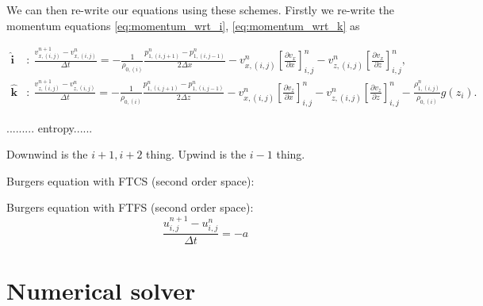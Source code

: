\documentclass{article}
\begin{document}
We can then re-write our equations using these schemes. Firstly we re-write the momentum equations \ref{eq:momentum_wrt_i}, \ref{eq:momentum_wrt_k} as

\begin{align}
    \mathbf{\hat{i}}&:\ \frac{v_{x,(i,j)}^{n+1}-v_{x,(i,j)}^{n}}{\Delta t} = -\frac{1}{\rho_{0,(i)}}\frac{p_{1,(i,j+1)}^n - p_{1,(i,j-1)}^n}{2\Delta x} - v_{x,(i,j)}^n \left[\frac{\partial v_{x}}{\partial x}\right]_{i,j}^n - v_{z,(i,j)}^n \left[\frac{\partial v_{x}}{\partial z}\right]_{i,j}^n, \\
    \mathbf{\hat{k}}&:\ \frac{v_{z,(i,j)}^{n+1}-v_{z,(i,j)}^{n}}{\Delta t} = -\frac{1}{\rho_{0,(i)}}\frac{p_{1,(i,j+1)}^n - p_{1,(i,j-1)}^n}{2\Delta z} - v_{x,(i,j)}^n \left[\frac{\partial v_{z}}{\partial x}\right]_{i,j}^n - v_{z,(i,j)}^n \left[\frac{\partial v_{z}}{\partial z}\right]_{i,j}^n - \frac{\rho_{1,(i,j)}^n}{\rho_{0,(i)}}g(z_i).
\end{align}


......... entropy......


Downwind is the $i+1, i+2$ thing. Upwind is the $i-1$ thing.


Burgers equation with FTCS (second order space):

Burgers equation with FTFS (second order space):
\begin{equation}
    \frac{u_{i,j}^{n+1}-u_{i,j}^n}{\Delta t} = -a \frac{}{}
\end{equation}



\section{Numerical solver}







\end{document}
